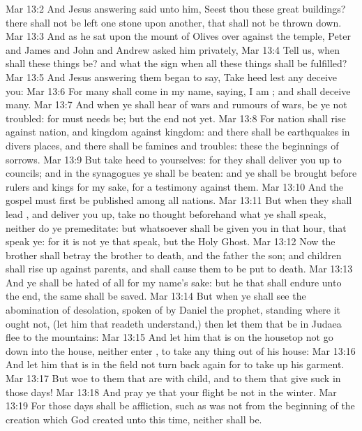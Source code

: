 \vs Mar 13:2 And Jesus answering said unto him, Seest thou these great buildings? there shall not be left one stone upon another, that shall not be thrown down.
\vs Mar 13:3 And as he sat upon the mount of Olives over against the temple, Peter and James and John and Andrew asked him privately,
\vs Mar 13:4 Tell us, when shall these things be? and what  the sign when all these things shall be fulfilled?
\vs Mar 13:5 And Jesus answering them began to say, Take heed lest any  deceive you:
\vs Mar 13:6 For many shall come in my name, saying, I am ; and shall deceive many.
\vs Mar 13:7 And when ye shall hear of wars and rumours of wars, be ye not troubled: for  must needs be; but the end  not  yet.
\vs Mar 13:8 For nation shall rise against nation, and kingdom against kingdom: and there shall be earthquakes in divers places, and there shall be famines and troubles: these  the beginnings of sorrows.
\vs Mar 13:9 But take heed to yourselves: for they shall deliver you up to councils; and in the synagogues ye shall be beaten: and ye shall be brought before rulers and kings for my sake, for a testimony against them.
\vs Mar 13:10 And the gospel must first be published among all nations.
\vs Mar 13:11 But when they shall lead , and deliver you up, take no thought beforehand what ye shall speak, neither do ye premeditate: but whatsoever shall be given you in that hour, that speak ye: for it is not ye that speak, but the Holy Ghost.
\vs Mar 13:12 Now the brother shall betray the brother to death, and the father the son; and children shall rise up against  parents, and shall cause them to be put to death.
\vs Mar 13:13 And ye shall be hated of all  for my name's sake: but he that shall endure unto the end, the same shall be saved.
\vs Mar 13:14 But when ye shall see the abomination of desolation, spoken of by Daniel the prophet, standing where it ought not, (let him that readeth understand,) then let them that be in Judaea flee to the mountains:
\vs Mar 13:15 And let him that is on the housetop not go down into the house, neither enter , to take any thing out of his house:
\vs Mar 13:16 And let him that is in the field not turn back again for to take up his garment.
\vs Mar 13:17 But woe to them that are with child, and to them that give suck in those days!
\vs Mar 13:18 And pray ye that your flight be not in the winter.
\vs Mar 13:19 For  those days shall be affliction, such as was not from the beginning of the creation which God created unto this time, neither shall be.
